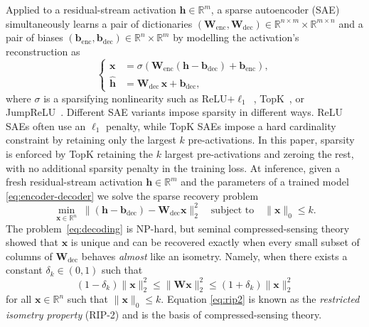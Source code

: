 \documentclass{article}
\theoremstyle{plain}
\theoremstyle{definition}
\theoremstyle{remark}
\begin{document}
Applied to a residual-stream activation $\mathbf{h} \in \mathbb{R}^m$, a sparse autoencoder (SAE) simultaneously learns a pair of dictionaries $(\mathbf{W}_{\mathrm{enc}}, \mathbf{W}_{\mathrm{dec}}) \in \mathbb{R}^{n \times m} \times \mathbb{R}^{m \times n}$ and a pair of biases $(\mathbf{b}_{\mathrm{enc}}, \mathbf{b}_{\mathrm{dec}}) \in \mathbb{R}^n \times \mathbb{R}^m$ by modelling the activation's reconstruction as
%
\begin{equation}
    \label{eq:encoder-decoder}
    \tag{SAE}
    \left\{
    \begin{aligned}
        \mathbf{x}        &= \sigma\!\left(\mathbf{W}_{\mathrm{enc}}(\mathbf{h} - \mathbf{b}_{\mathrm{dec}}) + \mathbf{b}_{\mathrm{enc}}\right), \\
        \hat{\mathbf{h}}  &= \mathbf{W}_{\mathrm{dec}}\,\mathbf{x} + \mathbf{b}_{\mathrm{dec}},
    \end{aligned}
    \right.
\end{equation}
%
where $\sigma$ is a sparsifying nonlinearity such as ReLU$+\ell_1$~\citep{cunningham2023sparse,bricken2023monosemanticity}, TopK~\citep{gao2024scaling}, or JumpReLU~\citep{rajamanoharan2024jumping}.
%
Different SAE variants impose sparsity in different ways. ReLU SAEs often use an $\ell_1$ penalty, while TopK SAEs impose a hard cardinality constraint by retaining only the largest $k$ pre-activations. In this paper, sparsity is enforced by TopK retaining the $k$ largest pre-activations and zeroing the rest, with no additional sparsity penalty in the training loss.
%
At inference, given a fresh residual-stream activation $\mathbf{h} \in \mathbb{R}^m$ and the parameters of a trained model \eqref{eq:encoder-decoder} we solve the sparse recovery problem
\begin{equation}
    \label{eq:decoding}
    \min_{\mathbf{x} \in \mathbb{R}^n}\;
    \bigl\lVert \left(\mathbf{h} - \mathbf{b}_{\mathrm{dec}}\right) - \mathbf{W}_{\mathrm{dec}} \mathbf{x} \bigr\rVert_2^2
    \quad \text{subject to} \quad \lVert \mathbf{x} \rVert_0 \le k.
\end{equation}
%
The problem~\eqref{eq:decoding} is NP-hard, but seminal compressed-sensing theory~\citep{candes2005decoding, donoho2006compressed} showed that $\mathbf{x}$ is unique and can be recovered exactly when every small subset of columns of $\mathbf{W}_{\mathrm{dec}}$ behaves {\em almost} like an isometry. Namely, when there exists a constant $\delta_k \in (0,1)$ such that
\begin{equation}
    \label{eq:rip2}
(1 - \delta_k)\|\mathbf{x}\|_2^2 \le \|\mathbf{W}\mathbf{x}\|_2^2 \le (1 + \delta_k)\|\mathbf{x}\|_2^2
\end{equation}
%
for all $\mathbf{x} \in \mathbb{R}^n$ such that $\|\mathbf{x}\|_0 \leq k$.
%
Equation \eqref{eq:rip2} is known as the {\em restricted isometry property} (RIP-2) and is the basis of compressed-sensing theory.
\end{document}
